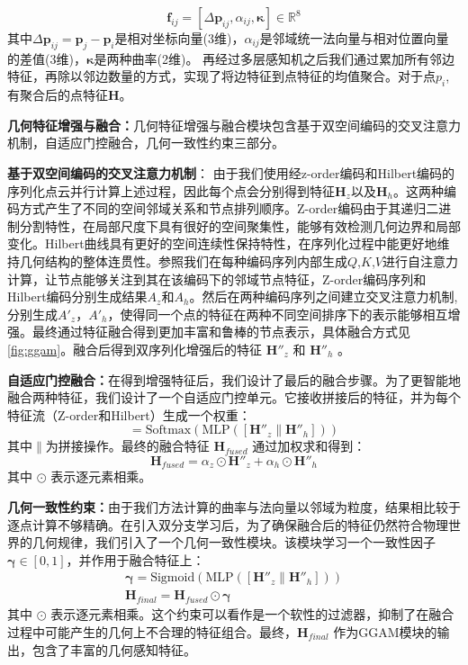 \documentclass[preprint,12pt]{elsarticle}
\begin{document}
\begin{equation}
	\mathbf{f}_{ij} = [\Delta\mathbf{p}_{ij}, \alpha_{ij},  \boldsymbol{\kappa}] \in \mathbb{R}^8
\end{equation}
其中$\Delta\mathbf{p}_{ij} = \mathbf{p}_j - \mathbf{p}_i$是相对坐标向量(3维)，$\alpha_{ij}$是邻域统一法向量与相对位置向量的差值(3维)，$\boldsymbol{\kappa}$是两种曲率(2维)。
再经过多层感知机之后我们通过累加所有邻边特征，再除以邻边数量的方式，实现了将边特征到点特征的均值聚合。对于点$p_i$,有聚合后的点特征$\mathbf{H}$。


\textbf{几何特征增强与融合：}几何特征增强与融合模块包含基于双空间编码的交叉注意力机制，自适应门控融合，几何一致性约束三部分。

\textbf{基于双空间编码的交叉注意力机制}：
由于我们使用经z-order编码和Hilbert编码的序列化点云并行计算上述过程，因此每个点会分别得到特征$\mathbf{H}_{z}$以及$\mathbf{H}_{h}$。这两种编码方式产生了不同的空间邻域关系和节点排列顺序。Z-order编码由于其递归二进制分割特性，在局部尺度下具有很好的空间聚集性，能够有效检测几何边界和局部变化。Hilbert曲线具有更好的空间连续性保持特性，在序列化过程中能更好地维持几何结构的整体连贯性。参照\cite{attention}我们在每种编码序列内部生成$Q$,$K$,$V$进行自注意力计算，让节点能够关注到其在该编码下的邻域节点特征，Z-order编码序列和Hilbert编码分别生成结果$A_z$和$A_h$。然后在两种编码序列之间建立交叉注意力机制,分别生成${A}'_z$，${A}'_h$，使得同一个点的特征在两种不同空间排序下的表示能够相互增强。最终通过特征融合得到更加丰富和鲁棒的节点表示，具体融合方式见\cref{fig:ggam}。融合后得到双序列化增强后的特征 $\mathbf{H}''_z$ 和 $\mathbf{H}''_h$ 。


\textbf{自适应门控融合：}在得到增强特征后，我们设计了最后的融合步骤。为了更智能地融合两种特征，我们设计了一个自适应门控单元。它接收拼接后的特征，并为每个特征流（Z-order和Hilbert）生成一个权重：
\begin{equation}
	[\alpha_z, \alpha_h] = \text{Softmax}(\text{MLP}([\mathbf{H}''_z \| \mathbf{H}''_h]))
	\label{eq:adaptive_gate}
\end{equation}
其中$\|$为拼接操作。最终的融合特征 $\mathbf{H}_{fused}$ 通过加权求和得到：
\begin{equation}
	\mathbf{H}_{fused} = \alpha_z \odot \mathbf{H}''_z + \alpha_h \odot \mathbf{H}''_h
	\label{eq:gated_fusion}
\end{equation}
其中 $\odot$ 表示逐元素相乘。


\textbf{几何一致性约束：}由于我们方法计算的曲率与法向量以邻域为粒度，结果相比较于逐点计算不够精确。在引入双分支学习后，为了确保融合后的特征仍然符合物理世界的几何规律，我们引入了一个几何一致性模块。该模块学习一个一致性因子 $\boldsymbol{\gamma} \in [0, 1]$，并作用于融合特征上：
\begin{gather}
	\boldsymbol{\gamma} = \text{Sigmoid}(\text{MLP}([\mathbf{H}''_z \| \mathbf{H}''_h])) \label{eq:consistency_factor} \\
	\mathbf{H}_{final} = \mathbf{H}_{fused} \odot \boldsymbol{\gamma} \label{eq:final_feature}
\end{gather}
其中 $\odot$ 表示逐元素相乘。这个约束可以看作是一个软性的过滤器，抑制了在融合过程中可能产生的几何上不合理的特征组合。最终，$\mathbf{H}_{final}$ 作为GGAM模块的输出，包含了丰富的几何感知特征。
\end{document}
